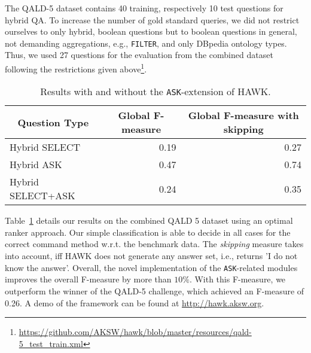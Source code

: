 The QALD-5 dataset contains 40 training, respectively 10 test questions for hybrid QA.
To increase the number of gold standard queries, we did not restrict ourselves to only hybrid, boolean questions but to boolean questions in general, not demanding aggregations, e.g., \texttt{FILTER}, and only DBpedia ontology types.
Thus, we used 27 questions for the evaluation from the combined dataset following the restrictions given above\footnote{\url{https://github.com/AKSW/hawk/blob/master/resources/qald-5_test_train.xml}}.

\begin{table}[htb!]
\centering
\caption{Results with and without the \texttt{ASK}-extension of HAWK.}
\label{tab:eval_ask}
\begin{tabular}{@{}lrr@{}}
\toprule
\multicolumn{1}{c}{{\bf Question Type}} & \multicolumn{1}{c}{{\bf Global F-measure}} & \multicolumn{1}{c}{{\bf Global F-measure with skipping}} \\ \midrule
Hybrid SELECT                           & 0.19                                       & 0.27                                                     \\
Hybrid ASK                              & 0.47                                       & 0.74                                                     \\
Hybrid SELECT+ASK                       & 0.24                                       & 0.35                                                     \\ \bottomrule
\end{tabular}
\end{table}

Table~\ref{tab:eval_ask} details our results on the combined QALD 5 dataset using an optimal ranker approach. 
Our simple classification is able to decide in all cases for the correct command method w.r.t. the benchmark data.
The \emph{skipping} measure takes into account, iff HAWK does not generate any answer set, i.e., returns 'I do not know the answer'.
Overall, the novel implementation of the \texttt{ASK}-related modules improves the overall F-measure by more than $10\%$. With this F-measure, we outperform the winner of the QALD-5 challenge, which achieved an F-measure of 0.26. 
A demo of the framework can be found at \url{http://hawk.aksw.org}.



